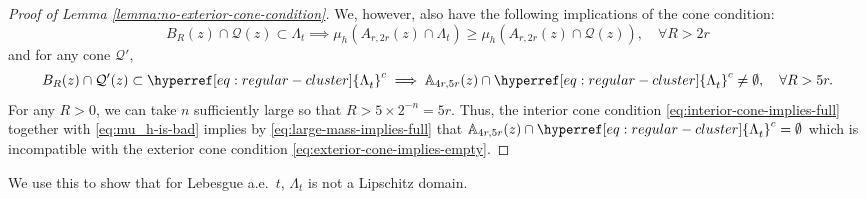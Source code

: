 \documentclass[12pt]{amsart}
\numberwithin{equation}{section}
\newcommand{\regcluster}[2]{\hyperref[eq:regular-cluster]{\Lambda^{#1}_{#2}}}
\begin{document}
\begin{proof}[Proof of Lemma \ref{lemma:no-exterior-cone-condition}]
		We, however, also have the following implications of the cone condition: 
		\begin{equation} \label{eq:interior-cone-implies-full}
		B_R(z) \cap \mathcal{Q}(z) \subset {\regcluster{}{t}}    \implies \mu_h(A_{r, 2r}(z) \cap {\regcluster{}{t}}) \geq 		\mu_h(A_{r, 2r}(z) \cap \mathcal{Q}(z)), \quad \forall R > 2 r
		\end{equation}
		and for any cone $\mathcal{Q}'$,
		\begin{equation} \label{eq:exterior-cone-implies-empty}
		B_R(z) \cap \mathcal{Q}'(z) \subset {{\regcluster{}{t}}}^c    \implies \A_{4 r, 5 r}(z) \cap {\regcluster{}{t}}^c \neq \emptyset, \quad \forall R > 5 r.
		\end{equation}
		For any $R > 0$, we can take $n$ sufficiently large so that $R > 5\times 2^{-n}=  5 r$. Thus, the  interior cone condition \eqref{eq:interior-cone-implies-full} together with \eqref{eq:mu_h-is-bad} implies by 
		\eqref{eq:large-mass-implies-full} that  $\A_{4r, 5r}(z) \cap {{\regcluster{}{t}}}^c = \emptyset$ which is incompatible
		with the exterior cone condition \eqref{eq:exterior-cone-implies-empty}.
	\end{proof}
	
	
	
	We use this to show that for Lebesgue a.e.\ $t$, ${\regcluster{}{t}}$ is not a Lipschitz domain. 
	
\end{document}
